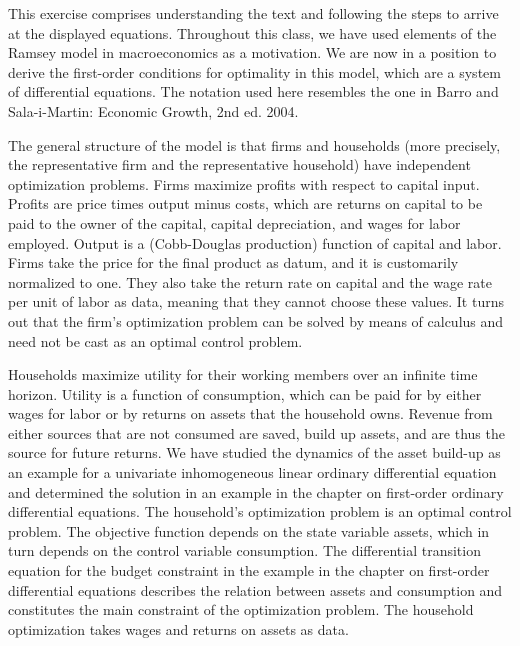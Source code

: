 \documentclass[graybox]{svmult}
\begin{document}
\smallskip

This exercise comprises understanding the text and following the steps to arrive at the displayed equations. Throughout this class, we have used elements of the Ramsey model in macroeconomics as a motivation.  We are now in a position to derive the first-order conditions for optimality in this model, which are a system of differential equations. The notation used here resembles the one in Barro and Sala-i-Martin: Economic Growth, 2nd ed. 2004.    

\smallskip

The general structure of the model is that firms and households (more precisely, the representative firm and the representative household) have independent optimization problems. Firms maximize profits with respect to capital input.  Profits are price times output minus costs, which are returns on capital to be paid to the owner of the capital, capital depreciation, and wages for labor employed.  Output is a (Cobb-Douglas production) function of capital and labor.  Firms take the price for the final product as datum, and it is customarily normalized to one.  They also take the return rate on capital and the wage rate per unit of labor as data, meaning that they cannot choose these values.  It turns out that the firm's optimization problem can be solved by means of calculus and need not be cast as an optimal control problem.

\smallskip

Households maximize utility for their working members over an infinite time horizon. Utility is a function of consumption, which can be paid for by either wages for labor or by returns on assets that the household owns.  Revenue from either sources that are not consumed are saved, build up assets, and are thus the source for future returns.  We have studied the dynamics of the asset build-up as an example for a univariate inhomogeneous linear ordinary differential equation and determined the solution in an example in the chapter on first-order ordinary differential equations.  The household's optimization problem is an optimal control problem.  The objective function depends on the state variable assets, which in turn depends on the control variable consumption.  The differential transition equation for the budget constraint in the example in the chapter on first-order differential equations describes the relation between assets and consumption and constitutes the main constraint of the optimization problem.  The household optimization takes wages and returns on assets as data.
\end{document}
